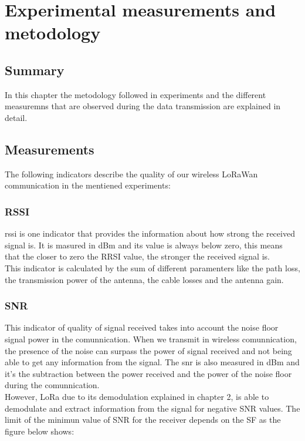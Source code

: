 
\chapter{Experimental measurements and metodology}
\label{chap:ex}
\ifpdf
    \graphicspath{{Chapter4/Figures/PNG/}{Chapter3/Figures/PDF/}{Chapter4/Figures/}}
\else
    \graphicspath{{Chapter4/Figures/EPS/}{Chapter3/Figures/}}
\fi


\section*{Summary}
In this chapter the metodology followed in experiments and the different measuremns 
that are observed during the data transmission are explained in detail.

\section{Measurements} 
\label{chap4:meas}

The following indicators describe the quality of our wireless LoRaWan communication 
in the mentiened experiments:

\subsection{RSSI}
\label{chap4:rssi}

\acrfull{rssi} is one indicator that provides the information 
about how strong the received signal is. It is masured in dBm and its value 
is always below zero, this means that the closer to zero the RRSI value, the stronger 
the received signal is.\\
This indicator is calculated by the sum of different paramenters like the path loss, 
the transmission power of the antenna, the cable losses and the antenna gain.

\subsection{SNR}
\label{chap4:snr}

This indicator of quality of signal received takes into account the noise floor signal power in the 
comunnication. When we transmit in wireless comunnication, the presence of the noise can surpass 
the power of signal received and not being able to get any information from the signal. The \acrfull{snr} is 
also measured in dBm and it's the subtraction between the power received and the power of the 
noise floor during the comunnication.\\
However, LoRa due to its demodulation explained in chapter 2, is able to demodulate 
and extract information from the signal for negative SNR values. The limit of the minimun 
value of SNR for the receiver depends on the SF as the figure below shows:

